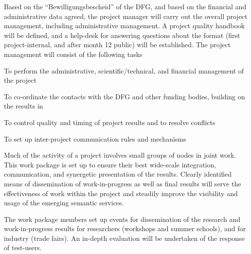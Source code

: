 \begin{workplan}   
\begin{workpackage}[id=management,title=Project Management,wphases=1-24!.3,
 RM=2,RAM=8]
  Based on the ``Bewilligungsbescheid'' of the DFG, and based on the financial and
  administrative data agreed, the project manager will carry out the overall project
  management, including administrative management.  A project quality handbook will be
  defined, and a {\pn} help-desk for answering questions about the format (first
  project-internal, and after month 12 public) will be established. The project management
  will consist of the following tasks
\begin{tasklist} 
\begin{task}[id=foo,wphases=0-3]%
  To perform the administrative, scientific/technical, and financial management of the
  project 
\end{task}
\begin{task}[id=bar,wphases=13-17!.5]
  To co-ordinate the contacts with the DFG and other funding bodies, building on the
  results in 
\end{task}
\begin{task}
  To control quality and timing of project results and to resolve conflicts
\end{task}
\begin{task}
  To set up inter-project communication rules and mechanisms
\end{task}
\end{tasklist}

\end{workpackage}
 
\begin{workpackage}[id=dissem,title=Dissemination and Exploitation,
RM=8]
Much of the activity of a project involves small groups of nodes in joint work. This work
 package is set up to ensure their best wide-scale integration, communication, and
 synergetic presentation of the results. Clearly identified means of dissemination of
 work-in-progress as well as final results will serve the effectiveness of work within the
 project and steadily improve the visibility and usage of the emerging semantic services.


 The work package members set up events for dissemination of the research and
 work-in-progress results for researchers (workshops and summer schools), and for industry
 (trade fairs). An in-depth evaluation will be undertaken of the response of test-users.
 

\end{workpackage}
\end{workplan}
